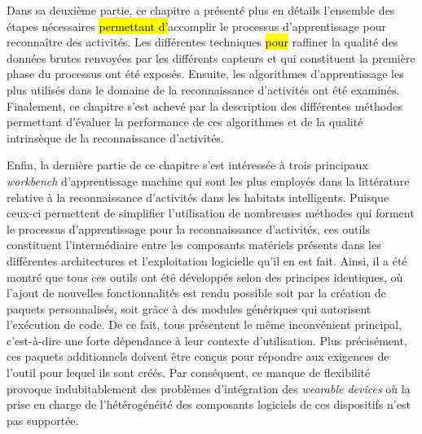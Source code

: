 Dans sa deuxième partie, ce chapitre a présenté plus en détails l'ensemble des étapes nécessaires \hl{permettant d'}accomplir le processus d'apprentissage pour reconnaître des activités. Les différentes techniques \hl{pour} raffiner la qualité des données brutes renvoyées par les différents capteurs et qui constituent la première phase du processus ont été exposés. Ensuite, les algorithmes d'apprentissage les plus utilisés dans le domaine de la reconnaissance d'activités ont été examinés. Finalement, ce chapitre s'est achevé par la description des différentes méthodes permettant d'évaluer la performance de ces algorithmes et de la qualité intrinsèque de la reconnaissance d'activités.

Enfin, la dernière partie de ce chapitre s'est intéressée à trois principaux \textit{workbench} d'apprentissage machine qui sont les plus employés dans la littérature relative à la reconnaissance d'activités dans les habitats intelligents. Puisque ceux-ci permettent de simplifier l'utilisation de nombreuses méthodes qui forment le processus d'apprentissage pour la reconnaissance d'activités, ces outils constituent l'intermédiaire entre les composants matériels présents dans les différentes architectures et l'exploitation logicielle qu'il en est fait. Ainsi, il a été montré que tous ces outils ont été développés selon des principes identiques, où l'ajout de nouvelles fonctionnalités est rendu possible soit par la création de paquets personnalisés, soit grâce à des modules génériques qui autorisent l'exécution de code. De ce fait, tous présentent le même inconvénient principal, c'est-à-dire une forte dépendance à leur contexte d'utilisation. Plus précisément, ces paquets additionnels doivent être conçus pour répondre aux exigences de l'outil pour lequel ils sont créés. Par conséquent, ce manque de flexibilité provoque indubitablement des problèmes d'intégration des \textit{wearable devices} où la prise en charge de l'hétérogénéité des composants logiciels de ces dispositifs n'est pas supportée.
